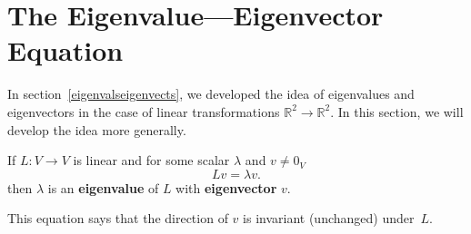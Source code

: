 







%




\section{The Eigenvalue---Eigenvector Equation}\label{evalsevectsII}

In section~\ref{eigenvalseigenvects}, we developed the idea of eigenvalues and eigenvectors in the case of linear transformations $\mathbb{R}^2\rightarrow \mathbb{R}^2$.  In this section, we will develop the idea more generally.


\begin{definition}
If $L \colon V\rightarrow V$ is linear and for some scalar $\lambda$ and $v\neq 0_V$
\[
Lv=\lambda v.
\]
then $\lambda$ is an {\bfseries eigenvalue} of $L$ with {\bfseries eigenvector} $v$.

\end{definition}
This equation says that the direction of $v$ is invariant (unchanged) under~$L$.  

